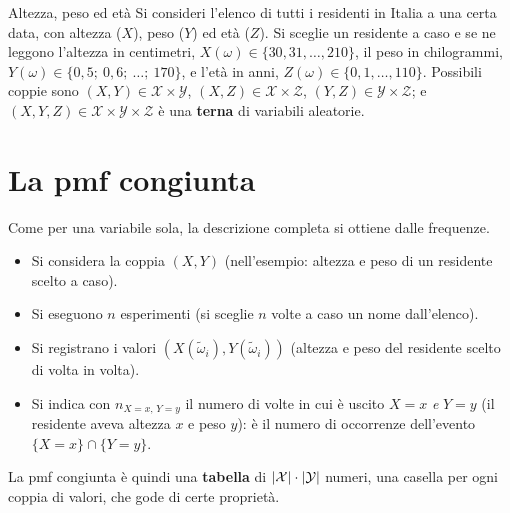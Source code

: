 \begin{esempio}{Altezza, peso ed età}
Si consideri l'elenco di tutti i residenti in Italia a una certa data, con altezza ($X$), peso ($Y$) ed età ($Z$). Si
sceglie un residente a caso e se ne leggono l'altezza in centimetri, $X(\omega) \in \{30, 31, \ldots, 210\}$, il peso
in chilogrammi, $Y(\omega) \in \{0{,}5;\ 0{,}6;\ \ldots;\ 170\}$, e l'età in anni, $Z(\omega) \in \{0, 1, \ldots,
110\}$. Possibili coppie sono $(X, Y) \in \mathcal{X} \times \mathcal{Y}$, $(X, Z) \in \mathcal{X} \times
\mathcal{Z}$, $(Y, Z) \in \mathcal{Y} \times \mathcal{Z}$; e $(X, Y, Z) \in \mathcal{X} \times \mathcal{Y} \times
\mathcal{Z}$ è una \textbf{terna} di variabili aleatorie.
\end{esempio}

\section{La pmf congiunta}

Come per una variabile sola, la descrizione completa si ottiene dalle frequenze.
\begin{itemize}
  \item Si considera la coppia $(X, Y)$ (nell'esempio: altezza e peso di un residente scelto a caso).
  \item Si eseguono $n$ esperimenti (si sceglie $n$ volte a caso un nome dall'elenco).
  \item Si registrano i valori $(X(\tilde\omega_i), Y(\tilde\omega_i))$ (altezza e peso del residente scelto di volta
        in volta).
  \item Si indica con $n_{X=x,\, Y=y}$ il numero di volte in cui è uscito $X = x$ \emph{e} $Y = y$ (il residente aveva
        altezza $x$ e peso $y$): è il numero di occorrenze dell'evento $\{X = x\} \cap \{Y = y\}$.
\end{itemize}


La pmf congiunta è quindi una \textbf{tabella} di $\left\lvert \mathcal{X} \right\rvert \cdot \left\lvert \mathcal{Y} \right\rvert$ numeri, una casella per
ogni coppia di valori, che gode di certe proprietà.

